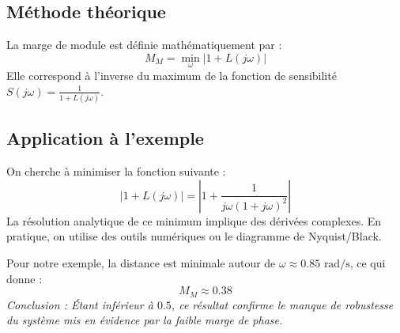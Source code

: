 \documentclass[12pt, a4paper]{article}
\begin{document}
\subsection{Méthode théorique}
La marge de module est définie mathématiquement par :
\begin{equation*}
    M_M = \min_{\omega} |1 + L(j\omega)|
\end{equation*}
Elle correspond à l'inverse du maximum de la fonction de sensibilité $S(j\omega) = \frac{1}{1 + L(j\omega)}$.

\subsection{Application à l'exemple}
On cherche à minimiser la fonction suivante :
\begin{equation*}
    |1 + L(j\omega)| = \left| 1 + \frac{1}{j\omega(1+j\omega)^2} \right|
\end{equation*}
La résolution analytique de ce minimum implique des dérivées complexes. En pratique, on utilise des outils numériques ou le diagramme de Nyquist/Black. 

Pour notre exemple, la distance est minimale autour de $\omega \approx 0.85 \text{ rad/s}$, ce qui donne :
\begin{equation*}
    M_M \approx 0.38
\end{equation*}
\textit{Conclusion : Étant inférieur à $0.5$, ce résultat confirme le manque de robustesse du système mis en évidence par la faible marge de phase.}
\end{document}
